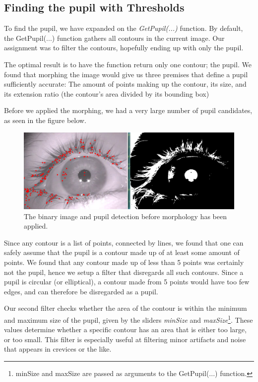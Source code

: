\subsection{Finding the pupil with Thresholds}
To find the pupil, we have expanded on the \emph{GetPupil(...)} function.\newline
By default, the GetPupil(...) function gathers all contours in the current image. Our assignment was to filter the contours, hopefully ending up with only the pupil.\newline

The optimal result is to have the function return only one contour; the pupil. We found that morphing the image would give us three premises that define a pupil sufficiently accurate: The amount of points making up the contour, its size, and its extension ratio (the contour's area divided by its bounding box)\newline

Before we applied the morphing, we had a very large number of pupil candidates, as seen in the figure below.\newline

\begin{figure}[h]
	\centering
	\includegraphics[scale=0.35]{many_pupils.png}
	\caption{The binary image and pupil detection before morphology has been applied.}
\end{figure}

Since any contour is a list of points, connected by lines, we found that one can safely assume that the pupil is a contour made up of at least some amount of points. We found that any contour made up of less than 5 points was certainly not the pupil, hence we setup a filter that disregards all such contours. Since a pupil is circular (or elliptical), a contour made from 5 points would have too few edges, and can therefore be disregarded as a pupil.\newline

Our second filter checks whether the area of the contour is within the minimum and maximum size of the pupil, given by the sliders \emph{minSize} and \emph{maxSize}\footnote{minSize and maxSize are passed as arguments to the GetPupil(...) function.}. These values determine whether a specific contour has an area that is either too large, or too small. This filter is especially useful at filtering minor artifacts and noise that appears in crevices or the like.\newline


